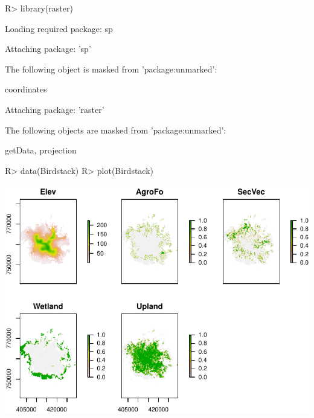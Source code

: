\documentclass[article]{jss}
\begin{document}
\begin{CodeChunk}

\begin{CodeInput}
R> library(raster)
\end{CodeInput}

\begin{CodeOutput}
Loading required package: sp
\end{CodeOutput}

\begin{CodeOutput}

Attaching package: 'sp'
\end{CodeOutput}

\begin{CodeOutput}
The following object is masked from 'package:unmarked':

    coordinates
\end{CodeOutput}

\begin{CodeOutput}

Attaching package: 'raster'
\end{CodeOutput}

\begin{CodeOutput}
The following objects are masked from 'package:unmarked':

    getData, projection
\end{CodeOutput}

\begin{CodeInput}
R> data(Birdstack)
R> plot(Birdstack)
\end{CodeInput}


\begin{center}\includegraphics{diversityocc_files/figure-latex/unnamed-chunk-27-1} \end{center}



\end{CodeChunk}
\end{document}
